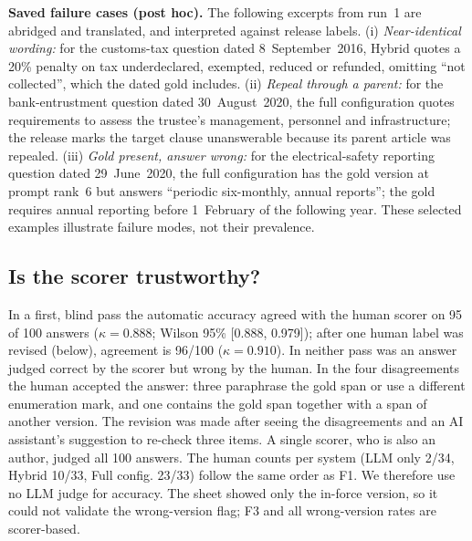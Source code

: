 \documentclass[sigconf,anonymous,review]{acmart}
\newcommand{\sys}[1]{\textsf{#1}}
\begin{document}
\textbf{Saved failure cases (post hoc).} The following excerpts from run~1 are abridged and translated, and interpreted against release labels. (i) \emph{Near-identical wording:} for the customs-tax question dated 8~September~2016, Hybrid quotes a 20\% penalty on tax underdeclared, exempted, reduced or refunded, omitting ``not collected'', which the dated gold includes. (ii) \emph{Repeal through a parent:} for the bank-entrustment question dated 30~August~2020, the full configuration quotes requirements to assess the trustee's management, personnel and infrastructure; the release marks the target clause unanswerable because its parent article was repealed. (iii) \emph{Gold present, answer wrong:} for the electrical-safety reporting question dated 29~June~2020, the full configuration has the gold version at prompt rank~6 but answers ``periodic six-monthly, annual reports''; the gold requires annual reporting before 1~February of the following year. These selected examples illustrate failure modes, not their prevalence.

\subsection{Is the scorer trustworthy?}

In a first, blind pass the automatic accuracy agreed with the human scorer on 95 of 100 answers ($\kappa=0.888$; Wilson 95\% [0.888, 0.979]); after one human label was revised (below), agreement is 96/100 ($\kappa=0.910$). In neither pass was an answer judged correct by the scorer but wrong by the human. In the four disagreements the human accepted the answer: three paraphrase the gold span or use a different enumeration mark, and one contains the gold span together with a span of another version. The revision was made after seeing the disagreements and an AI assistant's suggestion to re-check three items. A single scorer, who is also an author, judged all 100 answers. The human counts per system (\sys{LLM only} 2/34, \sys{Hybrid} 10/33, Full config. 23/33) follow the same order as F1. We therefore use no LLM judge for accuracy. The sheet showed only the in-force version, so it could not validate the wrong-version flag; F3 and all wrong-version rates are scorer-based.
\end{document}
